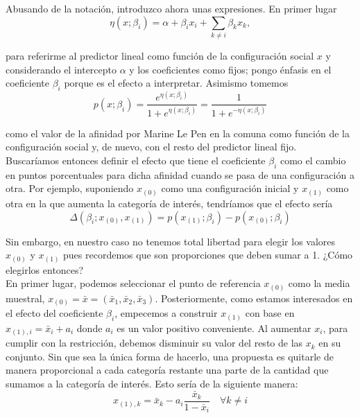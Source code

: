 Abusando de la notación, introduzco ahora unas expresiones. En primer lugar
\begin{equation*}
\eta(x;\beta_i)= \alpha + \beta_i x_i + \sum\limits_{k\neq i} \beta_k x_k, 
\end{equation*} 

para referirme al predictor lineal como función de la configuración social $x$ y considerando el intercepto $\alpha$ y los coeficientes como fijos; pongo énfasis en el coeficiente $\beta_i$ porque es el efecto a interpretar. Asimismo tomemos 
\begin{equation*}
p(x;\beta_i)=\dfrac{e^{\eta(x;\beta_i)}}{1+e^{\eta(x;\beta_i)}}=\dfrac{1}{1+e^{-\eta(x;\beta_i)}}
\end{equation*} 

como el valor de la afinidad por Marine Le Pen en la comuna como función de la configuración social y, de nuevo, con el resto del predictor lineal fijo.\\

 Buscaríamos entonces definir el efecto que tiene el coeficiente $\beta_i$ como el cambio en puntos porcentuales para dicha afinidad cuando se pasa de una configuración a otra. Por ejemplo, suponiendo $x_{(0)}$ como una configuración inicial y $x_{(1)}$ como otra en la que aumenta la categoría de interés, tendríamos que el efecto sería
\begin{equation*}
\Delta(\beta_i;x_{(0)},x_{(1)}) = p(x_{(1)};\beta_i)-p(x_{(0)};\beta_i)
\end{equation*}

Sin embargo, en nuestro caso no tenemos total libertad para elegir los valores $x_{(0)}$ y $x_{(1)}$ pues recordemos que son proporciones que deben sumar a 1. ¿Cómo elegirlos entonces?\\ 

En primer lugar, podemos seleccionar el punto de referencia $x_{(0)}$ como la media muestral, $x_{(0)}=\bar{x}=(\bar{x}_1,\bar{x}_2,\bar{x}_3)$. Posteriormente, como estamos interesados en el efecto del coeficiente $\beta_i$, empecemos a construir $x_{(1)}$ con base en $x_{(1),i}=\bar{x}_i + a_i$ donde $a_i$ es un valor positivo conveniente. Al aumentar $x_i$, para cumplir con la restricción, debemos disminuir su valor del resto de las $x_k$ en su conjunto. Sin que sea la única forma de hacerlo, una propuesta es quitarle de manera proporcional a cada categoría restante una parte de la cantidad que sumamos a la categoría de interés. Esto sería de la siguiente manera: 
\begin{equation*}
x_{(1),k}=\bar{x}_k - a_i \dfrac{\bar{x}_k}{1-\bar{x}_i} \quad \forall k \neq i
\end{equation*}

